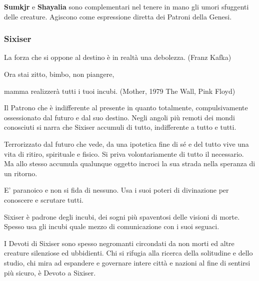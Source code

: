 \begin{multicols}{2}
\begin{changemargin}{0.3cm}{0.3cm}
\begin{narratore}
\medskip

\textbf{Sumkjr} e \textbf{Shayalia} sono complementari nel tenere in mano gli umori sfuggenti delle creature. Agiscono come espressione diretta dei Patroni della Genesi.

\end{narratore}\end{changemargin}


\subsubsection{Sixiser}\label{sixiser}\hypertarget{sixiser}{}

\begin{changemargin}{0.3cm}{0.3cm}\begin{enfasi}{
La forza che si oppone al destino è in realtà una debolezza. (Franz Kafka)

\medskip

Ora stai zitto, bimbo, non piangere,

mamma realizzerà tutti i tuoi incubi. (Mother, 1979 The Wall, Pink Floyd)

}\end{enfasi}\end{changemargin}\medskip


Il Patrono che è indifferente al presente in quanto totalmente, compulsivamente ossessionato dal futuro e dal suo destino. Negli angoli più remoti dei mondi conosciuti si narra che Sixiser accumuli di tutto, indifferente a tutto e tutti.

Terrorizzato dal futuro che vede, da una ipotetica fine di sé e del tutto vive una vita di ritiro, spirituale e fisico. Si priva volontariamente di tutto il necessario. Ma allo stesso accumula qualunque oggetto incroci la sua strada nella speranza di un ritorno.

E' paranoico e non si fida di nessuno. Usa i suoi poteri di divinazione per conoscere e scrutare tutti.

Sixiser è padrone degli incubi, dei sogni più spaventosi delle visioni di morte. Spesso usa gli incubi quale mezzo di comunicazione con i suoi seguaci.

I Devoti di Sixiser sono spesso negromanti circondati da non morti ed altre creature silenziose ed ubbidienti. Chi si rifugia alla ricerca della solitudine e dello studio, chi mira ad espandere e governare intere città e nazioni al fine di sentirsi più sicuro, è Devoto a Sixiser.




\end{multicols}
